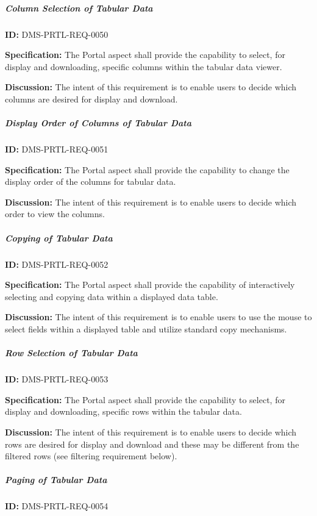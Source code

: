 \documentclass[SE,toc]{lsstdoc}
\begin{document}
\subparagraph{Column Selection of Tabular Data}\hfill  %

\label{DMS-PRTL-REQ-0050}
\textbf{ID:} DMS-PRTL-REQ-0050

\textbf{Specification:}
The Portal aspect shall provide the capability to select, for display and downloading, specific columns within the tabular data viewer.

\textbf{Discussion:}
The intent of this requirement is to enable users to decide which columns are desired for display and download.

\subparagraph{Display Order of Columns of Tabular Data}\hfill  %

\label{DMS-PRTL-REQ-0051}
\textbf{ID:} DMS-PRTL-REQ-0051

\textbf{Specification:}
The Portal aspect shall provide the capability to change the display order of the columns for tabular data.

\textbf{Discussion:}
The intent of this requirement is to enable users to decide which order to view the columns.

\subparagraph{Copying of Tabular Data}\hfill  %

\label{DMS-PRTL-REQ-0052}
\textbf{ID:} DMS-PRTL-REQ-0052

\textbf{Specification:}
The Portal aspect shall provide the capability of interactively selecting and copying data within a displayed data table.

\textbf{Discussion:}
The intent of this requirement is to enable users to use the mouse to select fields within a displayed table and utilize standard copy mechanisms.

\subparagraph{Row Selection of Tabular Data}\hfill  %

\label{DMS-PRTL-REQ-0053}
\textbf{ID:} DMS-PRTL-REQ-0053

\textbf{Specification:}
The Portal aspect shall provide the capability to select, for display and downloading, specific rows within the tabular data.

\textbf{Discussion:}
The intent of this requirement is to enable users to decide which rows are desired for display and download and these may be different from the filtered rows (see filtering requirement below).

\subparagraph{Paging of Tabular Data}\hfill  %

\label{DMS-PRTL-REQ-0054}
\textbf{ID:} DMS-PRTL-REQ-0054
\end{document}
